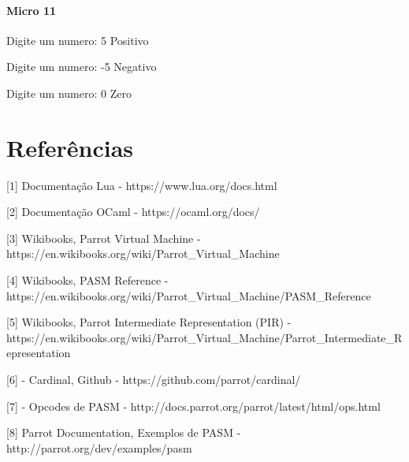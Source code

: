 \documentclass[12pt,a4paper,twoside]{report}
\begin{document}
\subsubsection{Micro 11}


\begin{terminal}
Digite um numero: 5
Positivo

Digite um numero: -5
Negativo

Digite um numero: 0
Zero
\end{terminal}


\chapter{Referências}
[1] Documentação Lua - https://www.lua.org/docs.html

[2] Documentação OCaml - https://ocaml.org/docs/

[3] Wikibooks, Parrot Virtual Machine - https://en.wikibooks.org/wiki/Parrot_Virtual_Machine

[4] Wikibooks, PASM Reference - https://en.wikibooks.org/wiki/Parrot_Virtual_Machine/PASM_Reference

[5] Wikibooks, Parrot Intermediate Representation (PIR) - https://en.wikibooks.org/wiki/Parrot_Virtual_Machine/Parrot_Intermediate_Representation

[6] - Cardinal, Github - https://github.com/parrot/cardinal/

[7] - Opcodes de PASM - http://docs.parrot.org/parrot/latest/html/ops.html

[8] Parrot Documentation, Exemplos de PASM - http://parrot.org/dev/examples/pasm

\clearpage
{}
\appendix
\end{document}
